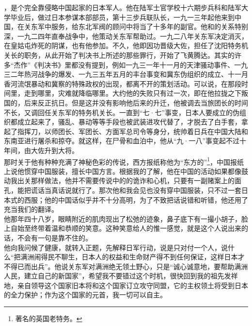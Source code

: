 ，是个完全靠侵略中国起家的日本军人。他在陆军士官学校十六期步兵科和陆军大学毕业后，做过日本参谋本部部员，第十三步兵联队长，一九一三年起他来到中国，在关东军中服务，给东北军阀的顾问中将当了十多年的副官。他和的关系特别深，一九二四年直奉战争中，他策动关东军帮助过。一九二八年关东军决定消灭，在皇姑屯炸死的阴谋，也有他参加。不久，他即因功晋级大佐，担任了沈阳特务机关长的职务，从此开始了判决书上所述的那些罪行，开始了飞黄腾达。其实的许多“杰作”《判决书》里都没有提到，例如一九三一年十一月的天津骚动事件、一九三二年热河战争的爆发、一九三五年五月的丰台事变和冀东伪组织的成立、十一月香河流氓暴动和冀察的特殊政权的出现，都离不开的策划活动。可以说，在那段时间里，走到哪里，灾难就降临哪里。大约他的失败只有过一次，即在他拉拢之下叛国的，后来反正抗日。但是这并没有影响他后来的升迁，他被调去当旅团长的时间不长，又调回任关东军的特务机关长。一直到“七·七”事变，日本人要成立的伪组织都成立起来了，骚乱、暴动等等手段也被武装进攻代替了，才脱去了白手套，拿起了指挥刀，以师团长、军团长、方面军总司令等身分，统帅着日兵在中国大陆和东南亚进行屠杀和掠夺。就这样，在尸骨和血泊中，他从“九·一八”事变起不过十年间，由大佐升到大将。\\

那时关于他有种种充满了神秘色彩的传说，西方报纸称他为“东方的”\footnote{著名的英国老特务。}，中国报纸上说他惯穿中国服装，擅长中国方言。根据我的了解，他在中国的活动如果都像鼓动我出关那样做法，他并不需要传说中的的诡诈和心机，只要有一副赌案上的面孔，能把谎话当真话说就行了。那次他和我会见也没有穿中国服装，只不过一套日本式的西服；他的中国话似乎并不十分高明，为了不致把话说错和听错，他还用了充当我们的翻译。\\

他那年四十八岁，眼睛附近的肌肉现出了松弛的迹象，鼻子底下有一撮小胡子，脸上自始至终带着温和恭顺的笑意。这种笑意给人的惟一感觉，就是这个人说出来的话，不会有一句是靠不住的。\\

他向我问候了健康，就转入正题，先解释日军行动，说是只对付一个人，说什么“把满洲闹得民不聊生，日本人的权益和生命财产得不到任何保证，这样日本才不得已而出兵”。他说关东军对满洲绝无领土野心，只是“诚心诚意地，要帮助满洲人民，建立自己的新国家”，希望我不要错过这个时机，很快回到我的祖先发祥地，亲自领导这个国家旧本将和这个国家订立攻守同盟，它的主权领土将受到日本的全力保护；作为这个国家的元首，我一切可以自主。\\

